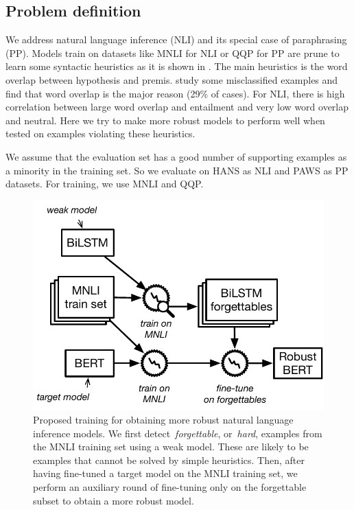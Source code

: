 \subsection{Problem definition}
We address natural language inference (NLI) and its special case of paraphrasing (PP).
Models train on datasets like MNLI for NLI or QQP for PP
are prune to learn some syntactic heuristics as it 
is shown in .
The main heuristics is the word overlap between hypothesis and premis.  study some misclassified examples and find that word overlap is the major reason (29\% of cases). For NLI, there is high correlation between large word overlap and entailment and very low word overlap and neutral.
Here we try to make more robust models to perform well when tested on examples violating these heuristics.

We assume that the evaluation set  has 
a good number of supporting examples as a minority in the training set.
So we evaluate on HANS as NLI and PAWS as PP datasets.
For training, we use MNLI and QQP. 



\begin{figure}[tbp]
\centering
\includegraphics[scale=0.55]{figures/acl.pdf}
\caption{Proposed training for obtaining more robust natural language inference models. We first detect~\emph{forgettable}, or~\emph{hard}, examples from the MNLI training set using a weak model. These are likely to be examples that cannot be solved by simple heuristics. Then, after having fine-tuned a target model on the MNLI training set, we perform an auxiliary round of fine-tuning only on the forgettable subset to obtain a more robust model.}
\label{fig:method}
\end{figure}

